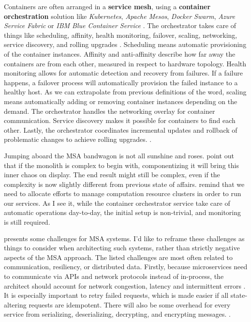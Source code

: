\documentclass[utf8,english]{gradu3}
\begin{document}
Containers are often arranged in a \textbf{service mesh}, using a
\textbf{container orchestration} solution like \textit{Kubernetes},
\textit{Apache Mesos}, \textit{Docker Swarm}, \textit{Azure Service Fabric} or
\textit{IBM Blue Container Service} \parencite[18]{Gannon2017}. The orchestrator
takes care of things like scheduling, affinity, health monitoring, failover,
scaling, networking, service discovery, and rolling upgrades
\parencite{Microsoft2022-CNA}. Scheduling means automatic provisioning of
the container instances. Affinity and anti-affinity describe how far
away the containers are from each other, measured in respect to hardware
topology. Health monitoring allows for automatic detection and recovery
from failures. If a failure happens, a failover process will
automatically provision the failed instance to a healthy host. As we can
extrapolate from previous definitions of the word, scaling means
automatically adding or removing container instances depending on the demand.
The orchestrator handles the networking overlay for container
communication. Service discovery makes it possible for containers to
find each other. Lastly, the orchestrator coordinates incremental updates and
rollback of problematic changes to achieve rolling upgrades.
\parencite{Microsoft2022-CNA}.

Jumping aboard the MSA bandwagon is not all sunshine and roses.
\textcite[18]{Li2021} point out that if the monolith is complex to begin with,
componentizing it will bring this inner chaos on display. The end result might
still be complex, even if the complexity is now slightly different from previous state of affairs.
\textcite[20]{Gannon2017} remind
that we need to allocate efforts to manage computation resource clusters in
order to run our services. As I see it, while the container orchestrator service
take care of automatic operations day-to-day, the initial setup is non-trivial,
and monitoring is still required.

\textcite{Microsoft2022-CNA} presents some challenges for MSA systems.  I'd like
to reframe these challenges as things to consider when architecting such
systems, rather than strictly negative aspects of the MSA approach. The listed
challenges are most often related to communication, resiliency, or
distributed data. Firstly, because microservices need to communicate via APIs and network
protocols instead of in-process, the architect should account for network
congestion, latency and intermittent errors
\parencite{Microsoft2022-Communication}. It is especially important to retry
failed requests, which is made easier if all state-altering requests are
idempotent. There will also be some overhead for every service from serializing,
deserializing, decrypting, and encrypting messages.
\parencite{Microsoft2022-Communication}.
\end{document}
